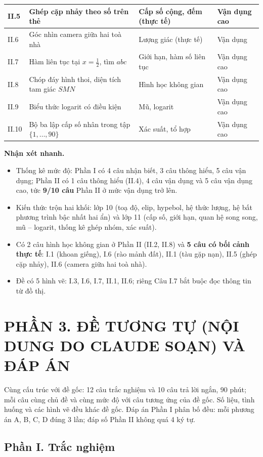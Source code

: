 \documentclass[11pt,a4paper]{article}
\begin{document}
\begin{longtable}{|p{1cm}|p{7.2cm}|p{5cm}|p{2.4cm}|}
II.5 & Ghép cặp nhảy theo số trên thẻ & Cấp số cộng, đếm (thực tế) & Vận dụng cao\\ \hline
II.6 & Góc nhìn camera giữa hai toà nhà & Lượng giác (thực tế) & Vận dụng\\ \hline
II.7 & Hàm liên tục tại $x=\frac12$, tìm $abc$ & Giới hạn, hàm số liên tục & Vận dụng cao\\ \hline
II.8 & Chóp đáy hình thoi, diện tích tam giác $SMN$ & Hình học không gian & Vận dụng cao\\ \hline
II.9 & Biểu thức logarit có điều kiện & Mũ, logarit & Vận dụng cao\\ \hline
II.10 & Bộ ba lập cấp số nhân trong tập $\{1,\dots,90\}$ & Xác suất, tổ hợp & Vận dụng cao\\ \hline
\end{longtable}

\textbf{Nhận xét nhanh.}
\begin{itemize}\setlength{\itemsep}{1pt}
\item Thống kê mức độ: Phần I có 4 câu nhận biết, 3 câu thông hiểu, 5 câu vận dụng; Phần II có 1 câu thông hiểu (II.4), 4 câu vận dụng và 5 câu vận dụng cao, tức \textbf{9/10 câu} Phần II ở mức vận dụng trở lên.
\item Kiến thức trộn hai khối: lớp 10 (toạ độ, elip, hypebol, hệ thức lượng, hệ bất phương trình bậc nhất hai ẩn) và lớp 11 (cấp số, giới hạn, quan hệ song song, mũ -- logarit, thống kê ghép nhóm, xác suất).
\item Có 2 câu hình học không gian ở Phần II (II.2, II.8) và \textbf{5 câu có bối cảnh thực tế}: I.1 (khoan giếng), I.6 (rào mảnh đất), II.1 (tàu gặp nạn), II.5 (ghép cặp nhảy), II.6 (camera giữa hai toà nhà).
\item Đề có 5 hình vẽ: I.3, I.6, I.7, II.1, II.6; riêng Câu I.7 bắt buộc đọc thông tin từ đồ thị.
\end{itemize}

\newpage
\section{PHẦN 3. ĐỀ TƯƠNG TỰ (NỘI DUNG DO CLAUDE SOẠN) VÀ ĐÁP ÁN}
Cùng cấu trúc với đề gốc: 12 câu trắc nghiệm và 10 câu trả lời ngắn, 90 phút; mỗi câu cùng chủ đề và cùng mức độ với câu tương ứng của đề gốc. Số liệu, tình huống và các hình vẽ đều khác đề gốc. Đáp án Phần I phân bố đều: mỗi phương án A, B, C, D đúng 3 lần; đáp số Phần II không quá 4 ký tự.

\subsection{Phần I. Trắc nghiệm}
\end{document}
